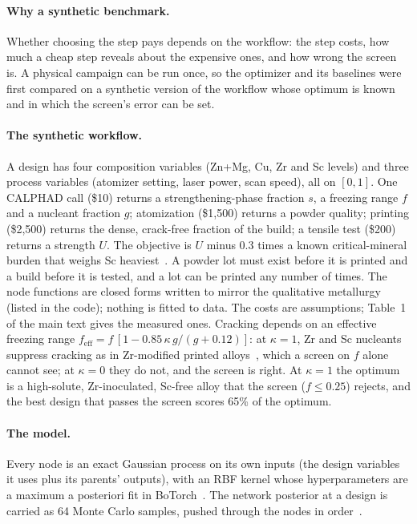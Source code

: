 \documentclass[11pt]{article}
\let\cite\autocite
\begin{document}
\paragraph{Why a synthetic benchmark.} Whether choosing the step pays depends on
the workflow: the step costs, how much a cheap step reveals about the expensive
ones, and how wrong the screen is. A physical campaign can be run once, so the
optimizer and its baselines were first compared on a synthetic version of the
workflow whose optimum is known and in which the screen's error can be set.

\paragraph{The synthetic workflow.} A design has four composition variables
(Zn+Mg, Cu, Zr and Sc levels) and three process variables (atomizer setting,
laser power, scan speed), all on $[0,1]$. One CALPHAD call (\$10) returns a
strengthening-phase fraction $s$, a freezing range $f$ and a nucleant fraction
$g$; atomization (\$1,500) returns a powder quality; printing (\$2,500) returns
the dense, crack-free fraction of the build; a tensile test (\$200) returns a
strength $U$. The objective is $U$ minus 0.3 times a known critical-mineral
burden that weighs Sc heaviest~\cite{nassar2020}. A powder lot must exist before
it is printed and a build before it is tested, and a lot can be printed any
number of times. The node functions are closed forms written to mirror the
qualitative metallurgy (listed in the code); nothing is fitted to data. The costs
are assumptions; Table~1 of the main text gives the measured ones. Cracking
depends on an effective freezing range
$f_\mathrm{eff}=f\,[1-0.85\,\kappa\,g/(g+0.12)]$: at $\kappa=1$, Zr and Sc
nucleants suppress cracking as in Zr-modified printed
alloys~\cite{martin2017,croteau2018}, which a screen on $f$
alone~\cite{kou2015} cannot see; at $\kappa=0$ they do not, and the screen is
right. At $\kappa=1$ the optimum is a high-solute, Zr-inoculated, Sc-free alloy
that the screen ($f\le0.25$) rejects, and the best design that passes the screen
scores 65\% of the optimum.

\paragraph{The model.} Every node is an exact Gaussian process on its own inputs
(the design variables it uses plus its parents' outputs), with an RBF kernel
whose hyperparameters are a maximum a posteriori fit in
BoTorch~\cite{balandat2020}. The
network posterior at a design is carried as 64 Monte Carlo samples, pushed
through the nodes in order~\cite{astudillo2021}.
\end{document}
